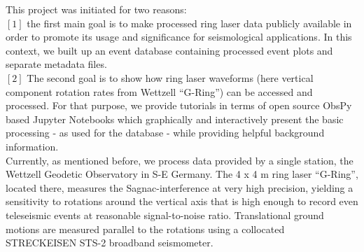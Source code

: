 \documentclass[12pt,reqno]{article} %
\begin{document}
This project was initiated for two reasons:\\ 
$[1]$ the first main goal is to make processed ring laser data publicly available in order to promote its usage and significance for seismological applications. In this context, we built up an event database containing processed event plots and separate metadata files.\\
$[2]$ The second goal is to show how ring laser waveforms (here vertical component rotation rates from Wettzell “G-Ring”) can be accessed and processed. For that purpose, we provide tutorials in terms of open source ObsPy \citep{Megies2011,Krischer2015} based Jupyter Notebooks \citep{Perez2007} which graphically and interactively present the basic processing - as used for the database - while providing helpful background information.
\\
Currently, as mentioned before, we process data provided by a single station, the Wettzell Geodetic Observatory in S-E Germany. The 4 x 4 m ring laser “G-Ring”, located there, measures the Sagnac-interference at very high precision, yielding a sensitivity to rotations around the vertical axis that is high enough to record even teleseismic events at reasonable signal-to-noise ratio.
Translational ground motions are measured parallel to the rotations using a collocated STRECKEISEN STS-2 broadband seismometer.
\\
% 
% 
\end{document}
